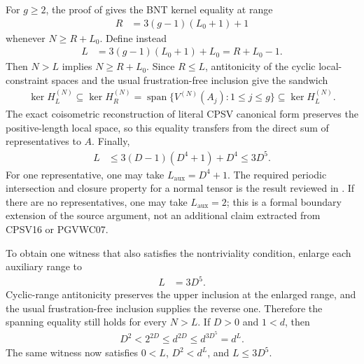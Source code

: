 \documentclass{article}
\begin{document}
For $g\geq2$, the proof of
\cite[Theorem~12]{PerezGarcia2007Matrix} gives the BNT kernel equality at
range
\begin{align}
    R&=3(g-1)(L_0+1)+1
    \label{eq:cpsv16_parent_hamiltonian_range_pgvwc_range}
\end{align}
whenever $N\geq R+L_0$. Define instead
\begin{align}
    L&=3(g-1)(L_0+1)+L_0=R+L_0-1.
    \label{eq:cpsv16_parent_hamiltonian_range_absorbed}
\end{align}
Then $N>L$ implies $N\geq R+L_0$. Since $R\leq L$, antitonicity of the
cyclic local-constraint spaces and the usual frustration-free inclusion give
the sandwich
\begin{align}
    \ker H_L^{(N)}
      \subseteq \ker H_R^{(N)}
      =\operatorname{span}\{V^{(N)}(A_j):1\leq j\leq g\}
      \subseteq \ker H_L^{(N)}.
    \label{eq:cpsv16_parent_hamiltonian_range_sandwich}
\end{align}
The exact coisometric reconstruction of literal CPSV canonical form preserves
the positive-length local space, so this equality transfers from the direct
sum of representatives to $A$. Finally,
\begin{align}
    L
      &\leq3(D-1)(D^4+1)+D^4
       \leq3D^5.
    \label{eq:cpsv16_parent_hamiltonian_range_bound}
\end{align}
For one representative, one may take $L_{\mathrm{aux}}=D^4+1$. The
required periodic intersection and closure property for a normal tensor is
the result reviewed in \cite[Section~IV.C]{Cirac2021Matrix}. If there are no
representatives, one may take $L_{\mathrm{aux}}=2$; this is a formal boundary
extension of the source argument, not an additional claim extracted from
CPSV16 or PGVWC07.

To obtain one witness that also satisfies the nontriviality condition, enlarge
each auxiliary range to
\begin{align}
    L&=3D^5.
    \label{eq:cpsv16_parent_hamiltonian_range_uniform}
\end{align}
Cyclic-range antitonicity preserves the upper inclusion at the enlarged
range, and the usual frustration-free inclusion supplies the reverse one.
Therefore the spanning equality still holds for every $N>L$. If $D>0$ and
$1<d$, then
\begin{align}
    D^2<2^{2D}\leq d^{2D}\leq d^{3D^5}=d^L.
    \label{eq:cpsv16_parent_hamiltonian_range_nontriviality}
\end{align}
The same witness now satisfies $0<L$, $D^2<d^L$, and $L\leq3D^5$.
\end{document}
